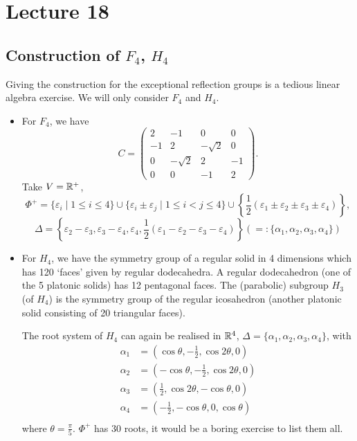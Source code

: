 \section{Lecture 18}

\subsection{Construction of $F_4$, $H_4$}

Giving the construction for the exceptional reflection groups is a tedious
linear algebra exercise. We will only consider $F_4$ and $H_4$.

\begin{itemize}
\item
For $F_4$, we have
\[
    C = \begin{pmatrix}
     2 &        -1 &         0 & 0 \\
    -1 &         2 & -\sqrt{2} & 0 \\
     0 & -\sqrt{2} &         2 & -1 \\
     0 &         0 &        -1 & 2
    \end{pmatrix}.
\]
Take $V = \mathbb{R}^+$,
\[
\Phi^+ = \{\varepsilon_i \mid 1 \leq i \leq 4 \} \cup
\{\varepsilon_i \pm \varepsilon_j \mid 1 \leq i < j \leq 4 \} \cup
\left\{\frac{1}{2} (\varepsilon_1 \pm \varepsilon_2 \pm \varepsilon_3 \pm
\varepsilon_4)\right\},
\]
\[
    \Delta = \left\{\varepsilon_2 - \varepsilon_3,
               \varepsilon_3 - \varepsilon_4,
               \varepsilon_4,
               \frac{1}{2} (\varepsilon_1 - \varepsilon_2 - \varepsilon_3
               - \varepsilon_4) \right\}
    (=: \{\alpha_1, \alpha_2, \alpha_3, \alpha_4\})
\]
\item
For $H_4$, we have the symmetry group of a regular solid in 4 dimensions which
has 120 `faces' given by regular dodecahedra.
A regular dodecahedron (one of the 5 platonic solids) has 12 pentagonal
faces. The (parabolic) subgroup $H_3$ (of $H_4$) is the symmetry group of the
regular icosahedron (another platonic solid consisting of 20 triangular
faces).

The root system of $H_4$ can again be realised in $\mathbb{R}^4$, $\Delta = \{\alpha_1,
\alpha_2, \alpha_3, \alpha_4\}$, with
\begin{align*}
    \alpha_1 &= \left(\cos \theta, -\frac{1}{2}, \cos 2\theta, 0 \right) \\
    \alpha_2 &= \left(-\cos \theta, -\frac{1}{2}, \cos 2\theta, 0 \right) \\
    \alpha_3 &= \left(\frac{1}{2}, \cos 2\theta, -\cos \theta, 0 \right) \\
    \alpha_4 &= \left(-\frac{1}{2}, -\cos \theta, 0, \cos \theta \right) \\
\end{align*}
where $\theta = \frac{\pi}{5}$.
$\Phi^+$ has 30 roots, it would be a boring exercise to list them all.
\end{itemize}

